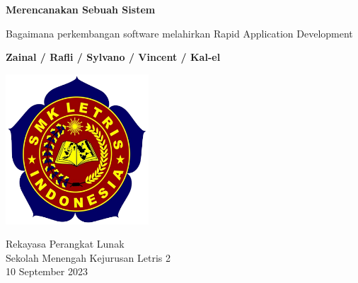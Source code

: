 \thispagestyle{plain}
\begin{titlepage}
    \begin{center}
        \vspace*{1cm}
        
        \Huge
        \textbf{Merencanakan Sebuah Sistem}
        
        \vspace{0.5cm}
        \LARGE
        Bagaimana perkembangan software melahirkan Rapid Application Development

        \vspace{1.5cm}
        
        \textbf{Zainal / Rafli / Sylvano / Vincent / Kal-el}
        
        \vspace{1cm}
        
        \includegraphics[width=0.4\textwidth]{images/letrisLogo.jpg}
        
        \vfill

        \Large
        Rekayasa Perangkat Lunak\\
        Sekolah Menengah Kejurusan Letris 2\\
        10 September 2023
        
    \end{center}
\end{titlepage}